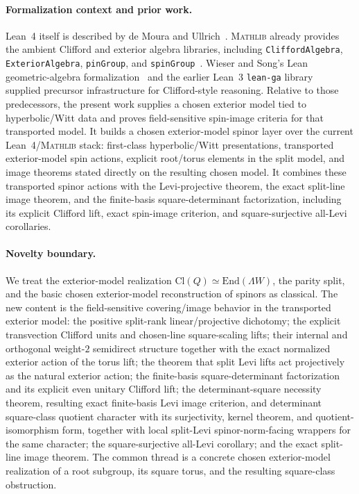 \documentclass{birkjour}
\theoremstyle{plain}
\theoremstyle{definition}
\theoremstyle{remark}
\newcommand{\Cl}{\mathrm{Cl}}
\newcommand{\End}{\mathrm{End}}
\newcommand{\wedgeW}{\Lambda W}
\newcommand{\Lean}{Lean~4\xspace}
\newcommand{\Mathlib}{\textsc{Mathlib}\xspace}
\DeclareRobustCommand{\code}[1]{\ifmmode\text{\nolinkurl{#1}}\else\nolinkurl{#1}\fi}
\begin{document}
\paragraph{Formalization context and prior work.}
\Lean itself is described by de Moura and Ullrich~{}\cite{deMouraUllrich2021}.
\Mathlib already provides the ambient Clifford and exterior algebra libraries,
including \code{CliffordAlgebra}, \code{ExteriorAlgebra}, \code{pinGroup}, and
\code{spinGroup}~{}\cite{MathlibCommunity2020,Mathlib}. Wieser and Song's Lean
geometric-algebra formalization~{}\cite{Wieser2022Clifford} and the earlier
Lean~3 \texttt{lean-ga} library~{}\cite{LeanGA} supplied precursor
infrastructure for Clifford-style reasoning. Relative to those predecessors, the
present work supplies a chosen exterior model tied to hyperbolic/Witt data and
proves field-sensitive spin-image criteria for that transported model. It builds
a chosen exterior-model spinor layer over the current \Lean/\Mathlib stack:
first-class hyperbolic/Witt presentations,
transported exterior-model spin actions, explicit root/torus elements in the
split model, and image theorems stated directly on the resulting chosen model.
It combines these transported spinor actions with the Levi-projective theorem,
the exact split-line image theorem, and the finite-basis square-determinant
factorization, including its explicit Clifford lift, exact spin-image
criterion, and square-surjective all-Levi corollaries.

\paragraph{Novelty boundary.} We treat the exterior-model
realization $\Cl(Q)\simeq\End(\wedgeW)$, the parity split, and the basic
chosen exterior-model reconstruction of spinors as classical. The new content is the
field-sensitive covering/image behavior in the transported exterior model: the
positive split-rank linear/projective dichotomy; the explicit transvection
Clifford units and chosen-line square-scaling lifts; their internal and
orthogonal weight-$2$
semidirect structure together with the exact normalized exterior action of the
torus lift; the theorem that split Levi lifts act projectively as the natural
exterior action; the finite-basis square-determinant factorization and its
explicit even unitary Clifford lift; the determinant-square necessity
theorem, resulting exact finite-basis Levi image criterion, and determinant
square-class quotient character with its surjectivity, kernel theorem, and quotient-isomorphism
form, together with local split-Levi spinor-norm-facing wrappers for the same
character; the
square-surjective all-Levi corollary; and the exact split-line image theorem.
The common thread is a concrete chosen exterior-model realization of a root subgroup,
its square torus, and the resulting square-class obstruction.
\end{document}
